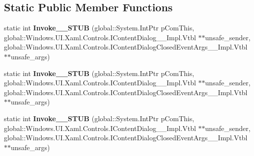 \subsection*{Static Public Member Functions}
\begin{DoxyCompactItemize}
\item 
\mbox{\label{struct_windows_1_1_foundation_1_1_typed_event_handler___a___windows___u_i___xaml___controls___co7a2cb13f58867dd2ebe18aa3ab56ee61_a9e25cceaa037b4116e15400dedd45cd9}} 
static int {\bfseries Invoke\+\_\+\+\_\+\+S\+T\+UB} (global\+::\+System.\+Int\+Ptr p\+Com\+This, global\+::\+Windows.\+U\+I.\+Xaml.\+Controls.\+I\+Content\+Dialog\+\_\+\+\_\+\+Impl.\+Vtbl $\ast$$\ast$unsafe\+\_\+sender, global\+::\+Windows.\+U\+I.\+Xaml.\+Controls.\+I\+Content\+Dialog\+Closed\+Event\+Args\+\_\+\+\_\+\+Impl.\+Vtbl $\ast$$\ast$unsafe\+\_\+args)
\item 
\mbox{\label{struct_windows_1_1_foundation_1_1_typed_event_handler___a___windows___u_i___xaml___controls___co7a2cb13f58867dd2ebe18aa3ab56ee61_a9e25cceaa037b4116e15400dedd45cd9}} 
static int {\bfseries Invoke\+\_\+\+\_\+\+S\+T\+UB} (global\+::\+System.\+Int\+Ptr p\+Com\+This, global\+::\+Windows.\+U\+I.\+Xaml.\+Controls.\+I\+Content\+Dialog\+\_\+\+\_\+\+Impl.\+Vtbl $\ast$$\ast$unsafe\+\_\+sender, global\+::\+Windows.\+U\+I.\+Xaml.\+Controls.\+I\+Content\+Dialog\+Closed\+Event\+Args\+\_\+\+\_\+\+Impl.\+Vtbl $\ast$$\ast$unsafe\+\_\+args)
\item 
\mbox{\label{struct_windows_1_1_foundation_1_1_typed_event_handler___a___windows___u_i___xaml___controls___co7a2cb13f58867dd2ebe18aa3ab56ee61_a9e25cceaa037b4116e15400dedd45cd9}} 
static int {\bfseries Invoke\+\_\+\+\_\+\+S\+T\+UB} (global\+::\+System.\+Int\+Ptr p\+Com\+This, global\+::\+Windows.\+U\+I.\+Xaml.\+Controls.\+I\+Content\+Dialog\+\_\+\+\_\+\+Impl.\+Vtbl $\ast$$\ast$unsafe\+\_\+sender, global\+::\+Windows.\+U\+I.\+Xaml.\+Controls.\+I\+Content\+Dialog\+Closed\+Event\+Args\+\_\+\+\_\+\+Impl.\+Vtbl $\ast$$\ast$unsafe\+\_\+args)
\item 

\end{DoxyCompactItemize}
